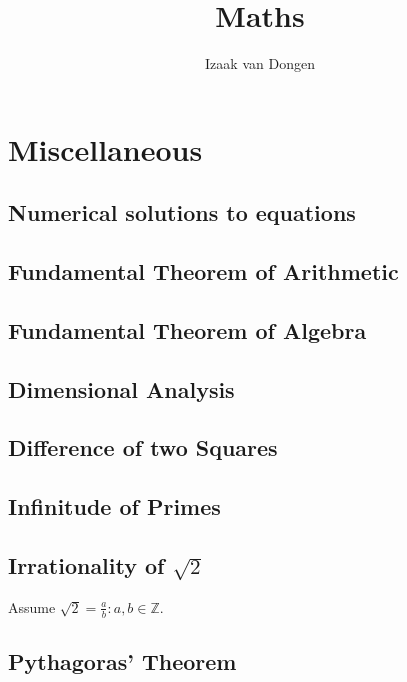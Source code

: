 \documentclass[a4paper,11pt]{article}
\title{Maths}
\author{Izaak van Dongen}
\begin{document}
    \maketitle\thispagestyle{empty} %
    \tableofcontents


    \section{Miscellaneous}

    \subsection{Numerical solutions to equations}

    \subsection{Fundamental Theorem of Arithmetic}

    \subsection{Fundamental Theorem of Algebra}

    \subsection{Dimensional Analysis}

    \subsection{Difference of two Squares}

    \subsection{Infinitude of Primes}

    \subsection[Irrationality of $\sqrt 2$]{Irrationality of \boldmath$\sqrt 2$}

    Assume $\sqrt 2 = \frac ab : a, b \in \mathbb{Z}$.

    \subsection{Pythagoras' Theorem} \label{sec:pythagoras}
\end{document}
